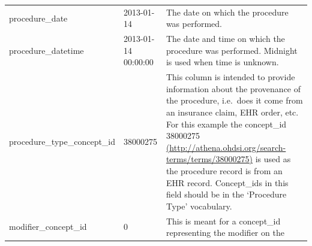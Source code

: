 \documentclass[]{book}
\begin{document}
\begin{longtable}[]{@{}lll@{}}
\begin{minipage}[t]{0.30\columnwidth}\raggedright\strut
procedure\_date\strut
\end{minipage} & \begin{minipage}[t]{0.14\columnwidth}\raggedright\strut
2013-01-14\strut
\end{minipage} & \begin{minipage}[t]{0.47\columnwidth}\raggedright\strut
The date on which the procedure was performed.\strut
\end{minipage}\tabularnewline
\begin{minipage}[t]{0.30\columnwidth}\raggedright\strut
procedure\_datetime\strut
\end{minipage} & \begin{minipage}[t]{0.14\columnwidth}\raggedright\strut
2013-01-14 00:00:00\strut
\end{minipage} & \begin{minipage}[t]{0.47\columnwidth}\raggedright\strut
The date and time on which the procedure was performed. Midnight is used
when time is unknown.\strut
\end{minipage}\tabularnewline
\begin{minipage}[t]{0.30\columnwidth}\raggedright\strut
procedure\_type\_concept\_id\strut
\end{minipage} & \begin{minipage}[t]{0.14\columnwidth}\raggedright\strut
38000275\strut
\end{minipage} & \begin{minipage}[t]{0.47\columnwidth}\raggedright\strut
This column is intended to provide information about the provenance of
the procedure, i.e.~does it come from an insurance claim, EHR order,
etc. For this example the concept\_id 38000275
\href{http://athena.ohdsi.org/search-terms/terms/38000275}{(http://athena.ohdsi.org/search-terms/terms/38000275)}
is used as the procedure record is from an EHR record. Concept\_ids in
this field should be in the `Procedure Type' vocabulary.\strut
\end{minipage}\tabularnewline
\begin{minipage}[t]{0.30\columnwidth}\raggedright\strut
modifier\_concept\_id\strut
\end{minipage} & \begin{minipage}[t]{0.14\columnwidth}\raggedright\strut
0\strut
\end{minipage} & \begin{minipage}[t]{0.47\columnwidth}\raggedright\strut
This is meant for a concept\_id representing the modifier on the

\end{minipage}
\end{longtable}
\end{document}
